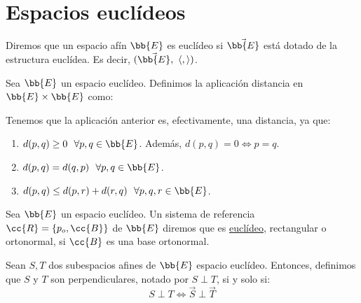\chapter{Espacios euclídeos}

\begin{definicion}
    Diremos que un espacio afín $\bb{E}$ es euclídeo si $\vec{\bb{E}}$ está dotado de la estructura euclídea. Es decir, $(\vec{\bb{E}},~\langle,\rangle)$.
\end{definicion}


\begin{definicion}[Distancia]
    Sea $\bb{E}$ un espacio euclídeo. Definimos la aplicación distancia en $\bb{E}\times \bb{E}$ como:
\end{definicion}

Tenemos que la aplicación anterior es, efectivamente, una distancia, ya que:
\begin{enumerate}
    \item $d(p,q)\geq 0~~\forall p,q\in \bb{E}$. Además, $d(p,q)=0\Longleftrightarrow p=q$.
    \item $d(p,q)=d(q,p)~~\forall p,q\in \bb{E}$.
    \item $d(p,q)\leq d(p,r) + d(r,q)~~\forall p,q,r\in \bb{E}$.
\end{enumerate}

\begin{definicion}
    Sea $\bb{E}$ un espacio euclídeo. Un sistema de referencia $\cc{R}=\{p_o,\cc{B}\}$ de $\bb{E}$ diremos que es \ul{euclídeo}, rectangular o ortonormal, si $\cc{B}$ es una base ortonormal.
\end{definicion}

\begin{definicion}
    Sean $S,T$ dos subespacios afines de $\bb{E}$ espacio euclídeo. Entonces, definimos que $S$ y $T$ son perpendiculares, notado por $S\perp T$, si y solo si:
    \begin{equation*}
        S\perp T \Longleftrightarrow \vec{S}\perp \vec{T}
    \end{equation*}
\end{definicion}

